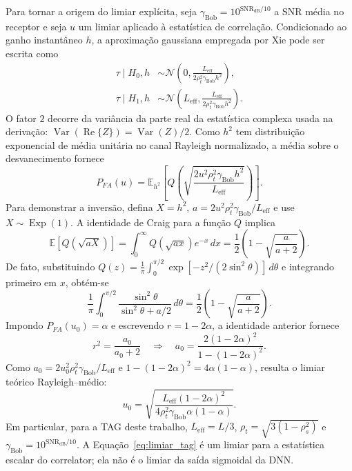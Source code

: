 \documentclass[12pt,a4paper]{article}
\begin{document}
Para tornar a origem do limiar explícita, seja $\gamma_{\mathrm{Bob}}=10^{\mathrm{SNR}_{\mathrm{dB}}/10}$ a SNR média no receptor e seja $u$ um limiar aplicado à estatística de correlação. Condicionado ao ganho instantâneo $h$, a aproximação gaussiana empregada por Xie pode ser escrita como
\begin{align}
    \tau\mid H_0,h &\sim \mathcal{N}\!\left(0,
    \frac{L_{\mathrm{eff}}}{2\rho_t^2\gamma_{\mathrm{Bob}}h^2}\right),\\
    \tau\mid H_1,h &\sim \mathcal{N}\!\left(L_{\mathrm{eff}},
    \frac{L_{\mathrm{eff}}}{2\rho_t^2\gamma_{\mathrm{Bob}}h^2}\right).
    \label{eq:tau_cond_h}
\end{align}
O fator $2$ decorre da variância da parte real da estatística complexa usada na derivação: $\operatorname{Var}(\operatorname{Re}\{Z\})=\operatorname{Var}(Z)/2$. Como $h^2$ tem distribuição exponencial de média unitária no canal Rayleigh normalizado, a média sobre o desvanecimento fornece
\begin{equation}
 P_{FA}(u)=\mathbb{E}_{h^2}\!\left[
 Q\!\left(\sqrt{\frac{2u^2\rho_t^2\gamma_{\mathrm{Bob}}h^2}{L_{\mathrm{eff}}}}\right)\right].
 \label{eq:pfa_rayleigh}
\end{equation}
Para demonstrar a inversão, defina $X=h^2$, $a=2u^2\rho_t^2\gamma_{\mathrm{Bob}}/L_{\mathrm{eff}}$ e use $X\sim\operatorname{Exp}(1)$. A identidade de Craig para a função $Q$ implica
\begin{equation}
    \mathbb{E}\left[Q\left(\sqrt{aX}\right)\right]
    =\int_0^\infty Q(\sqrt{ax})e^{-x}\,dx
    =\frac{1}{2}\left(1-\sqrt{\frac{a}{a+2}}\right).
    \label{eq:q_rayleigh_identity}
\end{equation}
De fato, substituindo $Q(z)=\frac{1}{\pi}\int_0^{\pi/2}
\exp[-z^2/(2\sin^2\theta)]\,d\theta$ e integrando primeiro em $x$, obtém-se
\begin{equation}
    \frac{1}{\pi}\int_0^{\pi/2}
    \frac{\sin^2\theta}{\sin^2\theta+a/2}\,d\theta
    =\frac{1}{2}\left(1-\sqrt{\frac{a}{a+2}}\right).
\end{equation}
Impondo $P_{FA}(u_0)=\alpha$ e escrevendo $r=1-2\alpha$, a identidade anterior fornece
\begin{equation}
    r^2=\frac{a_0}{a_0+2}
    \quad\Longrightarrow\quad
    a_0=\frac{2(1-2\alpha)^2}{1-(1-2\alpha)^2}.
    \label{eq:a0_rayleigh}
\end{equation}
Como $a_0=2u_0^2\rho_t^2\gamma_{\mathrm{Bob}}/L_{\mathrm{eff}}$ e
$1-(1-2\alpha)^2=4\alpha(1-\alpha)$, resulta o limiar teórico Rayleigh--médio:
\begin{equation}
    u_0=\sqrt{\frac{L_{\mathrm{eff}}(1-2\alpha)^2}
    {4\rho_t^2\gamma_{\mathrm{Bob}}\alpha(1-\alpha)}}.
    \label{eq:limiar_tag}
\end{equation}
Em particular, para a TAG deste trabalho, $L_{\mathrm{eff}}=L/3$, $\rho_t=\sqrt{3(1-\rho_s^2)}$ e $\gamma_{\mathrm{Bob}}=10^{\mathrm{SNR}_{\mathrm{dB}}/10}$. A Equação~\eqref{eq:limiar_tag} é um limiar para a estatística escalar do correlator; ela não é o limiar da saída sigmoidal da DNN.
\end{document}
